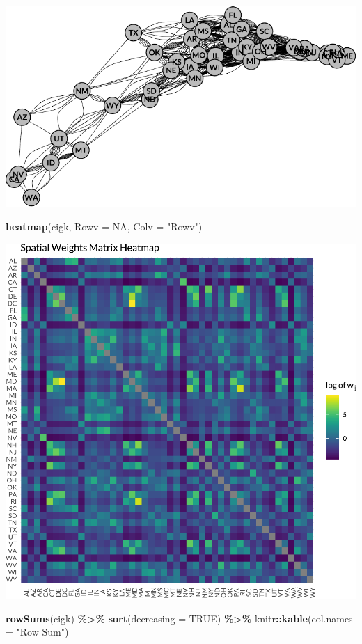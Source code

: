 \documentclass[
  a4paper,
]{article}
\newenvironment{Shaded}{\begin{snugshade}}{\end{snugshade}}
\newcommand{\AttributeTok}[1]{\textcolor[rgb]{0.13,0.29,0.53}{#1}}
\newcommand{\ConstantTok}[1]{\textcolor[rgb]{0.56,0.35,0.01}{#1}}
\newcommand{\FunctionTok}[1]{\textcolor[rgb]{0.13,0.29,0.53}{\textbf{#1}}}
\newcommand{\NormalTok}[1]{#1}
\newcommand{\SpecialCharTok}[1]{\textcolor[rgb]{0.81,0.36,0.00}{\textbf{#1}}}
\newcommand{\StringTok}[1]{\textcolor[rgb]{0.31,0.60,0.02}{#1}}
\begin{document}
\begin{center}\includegraphics[width=1\linewidth]{assignment3_files/figure-latex/plot_graph-1} \end{center}

\begin{Shaded}
\begin{Highlighting}[]
\FunctionTok{heatmap}\NormalTok{(cigk, }\AttributeTok{Rowv =} \ConstantTok{NA}\NormalTok{, }\AttributeTok{Colv =} \StringTok{"Rowv"}\NormalTok{)}
\end{Highlighting}
\end{Shaded}

\begin{center}\includegraphics[width=0.6\linewidth]{assignment3_files/figure-latex/plot_heatmap-1} \end{center}

\begin{Shaded}
\begin{Highlighting}[]
\FunctionTok{rowSums}\NormalTok{(cigk) }\SpecialCharTok{\%\textgreater{}\%}
    \FunctionTok{sort}\NormalTok{(}\AttributeTok{decreasing =} \ConstantTok{TRUE}\NormalTok{) }\SpecialCharTok{\%\textgreater{}\%}
\NormalTok{    knitr}\SpecialCharTok{::}\FunctionTok{kable}\NormalTok{(}\AttributeTok{col.names =} \StringTok{"Row Sum"}\NormalTok{)}
\end{Highlighting}
\end{Shaded}
\end{document}
